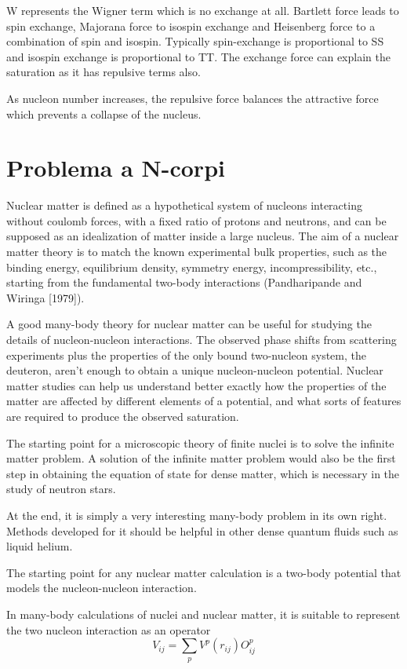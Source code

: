 \documentclass[main.tex]{subfiles}
\begin{document}
W represents the Wigner term which is no exchange at all. Bartlett force leads to spin exchange, Majorana force to isospin exchange and Heisenberg force to a combination of spin and isospin. Typically spin-exchange is proportional to SS and isospin exchange is proportional to TT. The exchange force can explain the saturation as it has repulsive terms also.

As nucleon number increases, the repulsive force balances the attractive force which prevents a collapse of the nucleus.


\section{Problema a N-corpi}

Nuclear matter is defined as a hypothetical system of nucleons interacting without coulomb forces, with a fixed ratio of protons and neutrons, and can be supposed as an idealization of matter inside a large nucleus. The aim of a nuclear matter theory is to match the known experimental bulk properties, such as the binding energy, equilibrium density, symmetry energy, incompressibility, etc., starting from the fundamental two-body interactions  (Pandharipande and Wiringa [1979]).

A good many-body theory for nuclear matter can be useful for studying the details of nucleon-nucleon interactions. The observed phase shifts from scattering experiments plus the properties of the only bound two-nucleon system, the deuteron, aren't enough to obtain a unique nucleon-nucleon potential. Nuclear matter studies can help us understand better exactly how the properties of the matter are affected by different elements of a potential, and what sorts of features are required to produce the observed saturation.

The starting point for a microscopic theory of finite nuclei is to solve the infinite matter problem. A solution of the infinite matter problem would also be the first step in obtaining the equation of state for dense matter, which is necessary in the study of neutron stars.

At the end, it is simply a very interesting many-body problem in its own right. Methods developed for it should be helpful in other dense quantum fluids such as liquid helium.

The starting point for any nuclear matter calculation is a two-body potential that models the nucleon-nucleon interaction.

In many-body calculations of nuclei and nuclear matter, it is suitable to represent the two nucleon interaction as an operator
\begin{equation*}
V_{ij}=\sum_pV^p(r_{ij})O^p_{ij}
\end{equation*}
\end{document}
